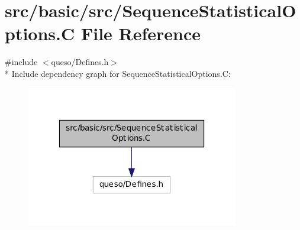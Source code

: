 \hypertarget{_sequence_statistical_options_8_c}{\section{src/basic/src/\-Sequence\-Statistical\-Options.C File Reference}
\label{_sequence_statistical_options_8_c}
}
{\ttfamily \#include $<$queso/\-Defines.\-h$>$}\\*
Include dependency graph for Sequence\-Statistical\-Options.\-C\-:
\nopagebreak
\begin{figure}[H]
\begin{center}
\leavevmode
\includegraphics[width=262pt]{_sequence_statistical_options_8_c__incl}
\end{center}
\end{figure}
